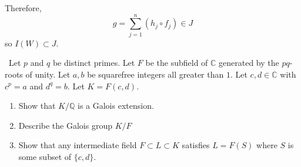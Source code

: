 \documentclass[12pt]{AlgebraQual}
\begin{document}
\begin{solution}
\begin{enumerate}[label=(\alph*)]
    Therefore, $$g= \sum_{j=1}^n(h_j\circ f_j)\in J$$ so $I(W)\subset J.$

\end{enumerate}
\end{solution}
\newpage



\begin{problem} $\,$
Let $p$ and $q$ be distinct primes. Let $F$ be the subfield of $\mathbb{C}$ generated by the $pq$-roots of unity. Let $a,b$ be squarefree integers all greater than $1.$ Let $c,d\in\mathbb{C}$ with $c^p=a$ and $d^q=b.$ Let $K=F(c,d).$
\begin{enumerate}[label=(\alph*)]
    \item Show that $K/\mathbb{Q}$ is a Galois extension.
    \item Describe the Galois group $K/F$
    \item Show that any intermediate field $F\subset L\subset K$ satisfies $L=F(S)$ where $S$ is some subset of $\{c,d\}.$
\end{enumerate}
\end{problem}
\end{document}
